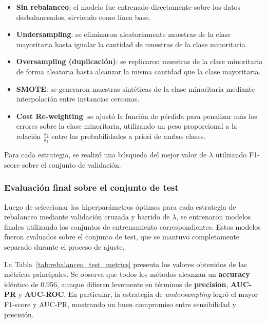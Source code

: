 \documentclass[11pt]{article}
\begin{document}
\begin{itemize}
    \item \textbf{Sin rebalanceo}: el modelo fue entrenado directamente sobre los datos desbalanceados, sirviendo como línea base.
    \item \textbf{Undersampling}: se eliminaron aleatoriamente muestras de la clase mayoritaria hasta igualar la cantidad de muestras de la clase minoritaria.
    \item \textbf{Oversampling (duplicación)}: se replicaron muestras de la clase minoritaria de forma aleatoria hasta alcanzar la misma cantidad que la clase mayoritaria.
    \item \textbf{SMOTE}: se generaron muestras sintéticas de la clase minoritaria mediante interpolación entre instancias cercanas.
    \item \textbf{Cost Re-weighting}: se ajustó la función de pérdida para penalizar más los errores sobre la clase minoritaria, utilizando un peso proporcional a la relación $\frac{\pi_2}{\pi_1}$ entre las probabilidades a priori de ambas clases.
\end{itemize}

Para cada estrategia, se realizó una búsqueda del mejor valor de $\lambda$ utilizando F1-score sobre el conjunto de validación.

\subsubsection*{Evaluación final sobre el conjunto de test}

Luego de seleccionar los hiperparámetros óptimos para cada estrategia de rebalanceo mediante validación cruzada y barrido de $\lambda$, se entrenaron modelos finales utilizando los conjuntos de entrenamiento correspondientes. Estos modelos fueron evaluados sobre el conjunto de test, que se mantuvo completamente separado durante el proceso de ajuste.

La Tabla~\ref{tab:rebalanceo_test_metrics} presenta los valores obtenidos de las métricas principales. Se observa que todos los métodos alcanzan un \textbf{accuracy} idéntico de 0.956, aunque difieren levemente en términos de \textbf{precision}, \textbf{AUC-PR} y \textbf{AUC-ROC}. En particular, la estrategia de \textit{undersampling} logró el mayor F1-score y AUC-PR, mostrando un buen compromiso entre sensibilidad y precisión.
\end{document}
